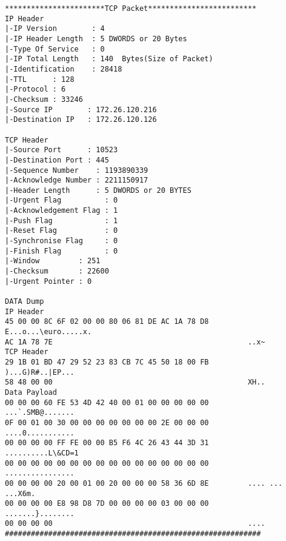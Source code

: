 \begin{lstlisting}[caption={Failed Connection snapshot},label={lst:data_dump},mathescape]
***********************TCP Packet*************************
IP Header
|-IP Version        : 4
|-IP Header Length  : 5 DWORDS or 20 Bytes
|-Type Of Service   : 0
|-IP Total Length   : 140  Bytes(Size of Packet)
|-Identification    : 28418
|-TTL      : 128
|-Protocol : 6
|-Checksum : 33246
|-Source IP        : 172.26.120.216
|-Destination IP   : 172.26.120.126

TCP Header
|-Source Port      : 10523
|-Destination Port : 445
|-Sequence Number    : 1193890339
|-Acknowledge Number : 2211150917
|-Header Length      : 5 DWORDS or 20 BYTES
|-Urgent Flag          : 0
|-Acknowledgement Flag : 1
|-Push Flag            : 1
|-Reset Flag           : 0
|-Synchronise Flag     : 0
|-Finish Flag          : 0
|-Window         : 251
|-Checksum       : 22600
|-Urgent Pointer : 0

DATA Dump                         
IP Header
45 00 00 8C 6F 02 00 00 80 06 81 DE AC 1A 78 D8         E...o...\euro.....x.
AC 1A 78 7E                                             ..x~
TCP Header
29 1B 01 BD 47 29 52 23 83 CB 7C 45 50 18 00 FB         )...G)R#..|EP...
58 48 00 00                                             XH..
Data Payload
00 00 00 60 FE 53 4D 42 40 00 01 00 00 00 00 00         ...`.SMB@.......
0F 00 01 00 30 00 00 00 00 00 00 00 2E 00 00 00         ....0...........
00 00 00 00 FF FE 00 00 B5 F6 4C 26 43 44 3D 31         ..........L\&CD=1
00 00 00 00 00 00 00 00 00 00 00 00 00 00 00 00         ................
00 00 00 00 20 00 01 00 20 00 00 00 58 36 6D 8E         .... ... ...X6m.
00 00 00 00 E8 98 D8 7D 00 00 00 00 03 00 00 00         .......}........
00 00 00 00                                             ....
###########################################################
\end{lstlisting}